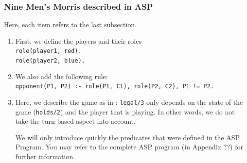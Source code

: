 \subsubsection{Nine Men's Morris described in ASP}

Here, each item refers to the last subsection.

\begin{enumerate}
\item First, we define the players and their roles\\
\texttt{role(player1, red).\\
role(player2, blue).\\}

\item We also add the following rule:\\
\texttt{opponent(P1, P2) :- role(P1, C1), role(P2, C2), P1 != P2.}

\item Here, we describe the game as in \cite{thielscher2009answer}: \texttt{legal/3} only depends on the state of the game (\texttt{holds/2}) and the player that is playing. In other words, we do not take the turn-based aspect into account.

\smallskip

We will only introduce quickly the predicates that were defined in the ASP Program. You may refer to the complete ASP program (in Appendix ??) for further information. 


\end{enumerate}
